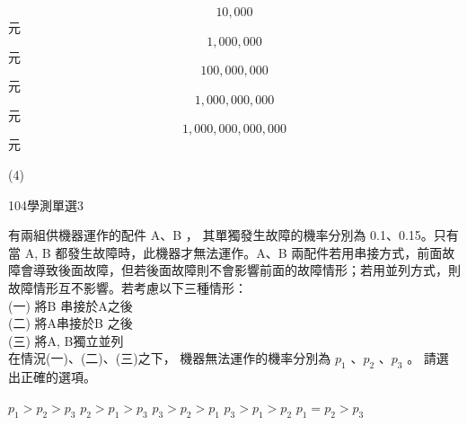 \begin{QUESTIONS}
\begin{QUESTION}
\begin{QBODY}
		\begin{QOPS}
			\QOP \[10,000\] 元
			\QOP \[1,000,000\] 元
			\QOP \[100,000,000\] 元
			\QOP \[1,000,000,000\] 元
			\QOP \[1,000,000,000,000\] 元
		\end{QOPS}
        \end{QBODY}
        \begin{QFROMS}
        \end{QFROMS}
        \begin{QTAGS}\end{QTAGS}
        \begin{QANS}
            (4)
        \end{QANS}
        \begin{QSOLLIST}
        \end{QSOLLIST}
        \begin{QEMPTYSPACE}
        \end{QEMPTYSPACE}
    \end{QUESTION}
    \begin{QUESTION}
        \begin{ExamInfo}{104}{學測}{單選}{3}
        \end{ExamInfo}
        \begin{ExamAnsRateInfo}{57}{78}{60}{33}
        \end{ExamAnsRateInfo}
        \begin{QBODY}
			有兩組供機器運作的配件 A、B ， 其單獨發生故障的機率分別為 0.1、0.15。只有當 A, B 都發生故障時，此機器才無法運作。A、B 兩配件若用串接方式，前面故障會導致後面故障，但若後面故障則不會影響前面的故障情形；若用並列方式，則故障情形互不影響。若考慮以下三種情形：\\
			(一) 將B 串接於A之後\\
			(二) 將A串接於B 之後\\
			(三) 將A, B獨立並列\\
			在情況(一)、(二)、(三)之下， 機器無法運作的機率分別為 ${{p}_{1}}$ 、${{p}_{2}}$ 、${{p}_{3}}$ 。
			請選出正確的選項。
			\begin{QOPS}
				\QOP ${{p}_{1}}>{{p}_{2}}>{{p}_{3}}$
				\QOP ${{p}_{2}}>{{p}_{1}}>{{p}_{3}}$
				\QOP ${{p}_{3}}>{{p}_{2}}>{{p}_{1}}$
				\QOP ${{p}_{3}}>{{p}_{1}}>{{p}_{2}}$
				\QOP ${{p}_{1}}={{p}_{2}}>{{p}_{3}}$
			\end{QOPS}
        \end{QBODY}
        \begin{QFROMS}
        \end{QFROMS}
        \begin{QTAGS}\end{QTAGS}

\end{QUESTION}
\end{QUESTIONS}
